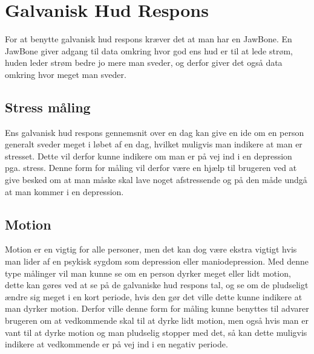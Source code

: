 \section{Galvanisk Hud Respons}
For at benytte galvanisk hud respons kræver det at man har en JawBone.
En JawBone giver adgang til data omkring hvor god ens hud er til at lede strøm, huden leder strøm bedre jo mere man sveder, og derfor giver det også data omkring hvor meget man sveder.


\subsection{Stress måling}
Ens galvanisk hud respons gennemsnit over en dag kan give en ide om en person generalt sveder meget i løbet af en dag, hvilket muligvis man indikere at man er stresset.
Dette vil derfor kunne indikere om man er på vej ind i en depression pga. stress.
Denne form for måling vil derfor være en hjælp til brugeren ved at give besked om at man måske skal lave noget afstressende og på den måde undgå at man kommer i en depression.

\subsection{Motion}
Motion er en vigtig for alle personer, men det kan dog være ekstra vigtigt hvis man lider af en psykisk sygdom som depression eller maniodepression.
Med denne type målinger vil man kunne se om en person dyrker meget eller lidt motion, dette kan gøres ved at se på de galvaniske hud respons tal, og se om de pludseligt ændre sig meget i en kort periode, hvis den gør det ville dette kunne indikere at man dyrker motion.
Derfor ville denne form for måling kunne benyttes til advarer brugeren om at vedkommende skal til at dyrke lidt motion, men også hvis man er vant til at dyrke motion og man pludselig stopper med det, så kan dette muligvis indikere at vedkommende er på vej ind i en negativ periode.

